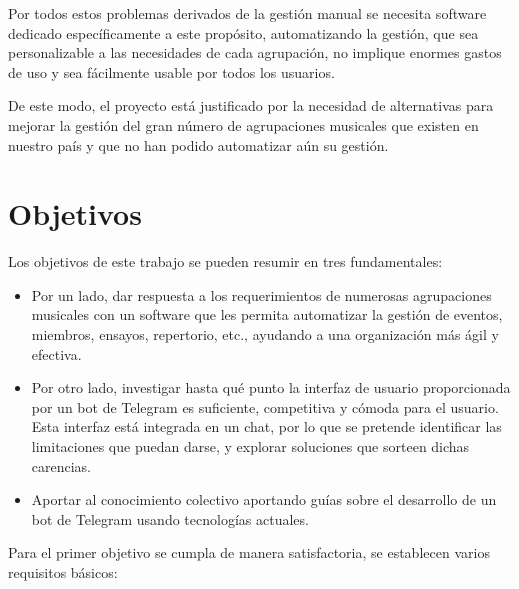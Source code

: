 Por todos estos problemas derivados de la gestión manual se necesita software dedicado específicamente a este propósito, automatizando la gestión, que sea personalizable a las necesidades de cada agrupación, no implique enormes gastos de uso y sea fácilmente usable por todos los usuarios.

De este modo, el proyecto está justificado por la necesidad de alternativas para mejorar la gestión del gran número de agrupaciones musicales que existen en nuestro país y que no han podido automatizar aún su gestión.

\section{Objetivos}


Los objetivos de este trabajo se pueden resumir en tres fundamentales:

\begin{itemize}
    \item Por un lado, dar respuesta a los requerimientos de numerosas agrupaciones musicales con un software que les permita automatizar la gestión de eventos, miembros, ensayos, repertorio, etc., ayudando a una organización más ágil y efectiva.
    \item Por otro lado, investigar hasta qué punto la interfaz de usuario proporcionada por un bot de Telegram es suficiente, competitiva y cómoda para el usuario. Esta interfaz está integrada en un chat, por lo que se pretende identificar las limitaciones que puedan darse, y explorar soluciones que sorteen dichas carencias.
    \item Aportar al conocimiento colectivo aportando guías sobre el desarrollo de un bot de Telegram usando tecnologías actuales.
\end{itemize}

Para el primer objetivo se cumpla de manera satisfactoria, se establecen varios requisitos básicos:

